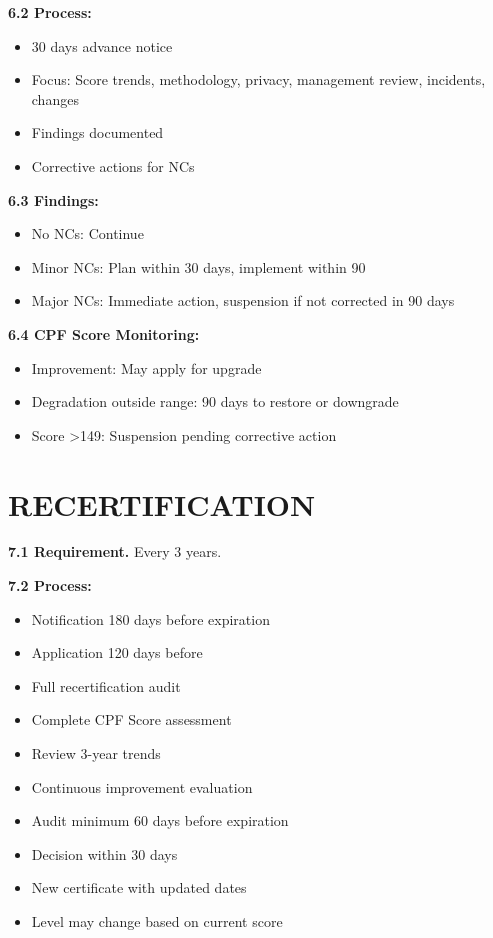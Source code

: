 \documentclass[11pt,a4paper]{article}
\begin{document}
\textbf{6.2 Process:}
\begin{itemize}
\item 30 days advance notice
\item Focus: Score trends, methodology, privacy, management review, incidents, changes
\item Findings documented
\item Corrective actions for NCs
\end{itemize}

\textbf{6.3 Findings:}
\begin{itemize}
\item No NCs: Continue
\item Minor NCs: Plan within 30 days, implement within 90
\item Major NCs: Immediate action, suspension if not corrected in 90 days
\end{itemize}

\textbf{6.4 CPF Score Monitoring:}
\begin{itemize}
\item Improvement: May apply for upgrade
\item Degradation outside range: 90 days to restore or downgrade
\item Score >149: Suspension pending corrective action
\end{itemize}

\section{RECERTIFICATION}

\textbf{7.1 Requirement.} Every 3 years.

\textbf{7.2 Process:}
\begin{itemize}
\item Notification 180 days before expiration
\item Application 120 days before
\item Full recertification audit
\item Complete CPF Score assessment
\item Review 3-year trends
\item Continuous improvement evaluation
\item Audit minimum 60 days before expiration
\item Decision within 30 days
\item New certificate with updated dates
\item Level may change based on current score
\end{itemize}
\end{document}
